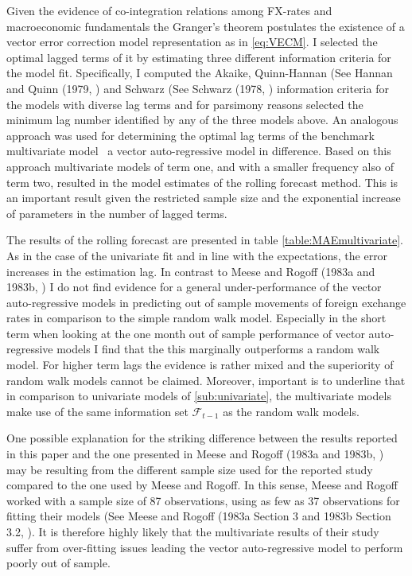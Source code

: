 Given the evidence of co-integration relations among FX-rates and
macroeconomic fundamentals the Granger's theorem postulates the
existence of a vector error correction model representation as in
\ref{eq:VECM}. I selected the optimal lagged terms of it by
estimating three different information criteria for the model
fit. Specifically, I computed the Akaike, Quinn-Hannan (See Hannan
and Quinn (1979, \cite{QuinnHannan}) and Schwarz (See Schwarz (1978,
\cite{Schwarz}) information criteria for the models with diverse lag
terms and for parsimony reasons selected the minimum lag number
identified by any of the three models above. An analogous approach was
used for determining the optimal lag terms of the benchmark
multivariate model \textendash \ a vector auto-regressive model in
difference. Based on this approach multivariate models of term one,
and with a smaller frequency also of term two, resulted in the model
estimates of the rolling forecast method.  This is an important result
given the restricted sample size and the exponential increase of
parameters in the number of lagged terms.

The results of the rolling forecast are presented in table
\ref{table:MAEmultivariate}. As in the case of the univariate fit and
in line with the expectations, the error increases in the estimation
lag. In contrast to Meese and Rogoff (1983a and 1983b,
\cite{MeeseRogoffa, MeeseRogoffb}) I do not find evidence for a
general under-performance of the vector auto-regressive models in
predicting out of sample movements of foreign exchange rates in
comparison to the simple random walk model. Especially in the short
term when looking at the one month out of sample performance of vector
auto-regressive models I find that the this marginally outperforms a
random walk model. For higher term lags the evidence is rather mixed
and the superiority of random walk models cannot be claimed. Moreover,
important is to underline that in comparison to univariate models of
\ref{sub:univariate}, the multivariate models make use of the same
information set $\mathscr{F}_{t-1}$ as the random walk models.

One possible explanation for the striking difference between the
results reported in this paper and the one presented in Meese and
Rogoff (1983a and 1983b, \cite{MeeseRogoffa, MeeseRogoffb}) may be
resulting from the different sample size used for the reported study
compared to the one used by Meese and Rogoff.  In this sense, Meese
and Rogoff worked with a sample size of 87 observations, using as few
as 37 observations for fitting their models (See Meese and Rogoff
(1983a Section 3 and 1983b Section 3.2, \cite{MeeseRogoffa,
  MeeseRogoffb}).  It is therefore highly likely that the multivariate
results of their study suffer from over-fitting issues leading the
vector auto-regressive model to perform poorly out of sample.

